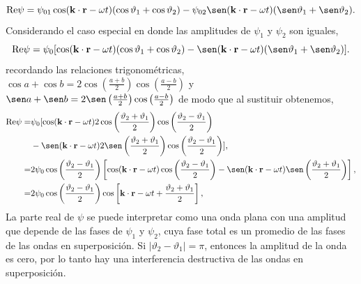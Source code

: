 \documentclass[11pt,fleqn]{book} %
\begin{document}
\begin{example}
\begin{equation*}
\text{Re} \psi=\psi_{01}\cos(\textbf{k}\cdot\textbf{r}-\omega t)(\cos \vartheta_1+\cos \vartheta_2)-\psi_{02}\sen (\textbf{k}\cdot\textbf{r}-\omega t)(\sen \vartheta_1+\sen \vartheta_2).
\end{equation*}
Considerando el caso especial en donde las amplitudes de $\psi_1$ y $\psi_2$ son iguales,
\begin{equation*}
\text{Re} \psi=\psi_{0}[\cos(\textbf{k}\cdot\textbf{r}-\omega t)(\cos \vartheta_1+\cos \vartheta_2)-\sen (\textbf{k}\cdot\textbf{r}-\omega t)(\sen \vartheta_1+\sen \vartheta_2)].
\end{equation*}
recordando las relaciones trigonom\'etricas, $\cos a+ \cos b=2\cos\left( \frac{a+b}{2} \right)\cos\left( \frac{a-b}{2} \right)$ y\\
 $\sen a+ \sen b=2\sen\left( \frac{a+b}{2} \right)\cos\left( \frac{a-b}{2} \right)$  de modo que al sustituir obtenemos,
\begin{equation*}
\begin{split}
\text{Re} \psi=&\psi_{0}[\cos(\textbf{k}\cdot\textbf{r}-\omega t)2\cos\left( \frac{\vartheta_2+\vartheta_1}{2} \right)\cos\left( \frac{\vartheta_2-\vartheta_1}{2} \right)\\
&-\sen (\textbf{k}\cdot\textbf{r}-\omega t)2\sen\left( \frac{\vartheta_2+\vartheta_1}{2} \right)\cos\left( \frac{\vartheta_2-\vartheta_1}{2} \right)],\\
=& 2 \psi_0\cos\left( \frac{\vartheta_2-\vartheta_1}{2} \right) \left[\cos(\textbf{k}\cdot\textbf{r}-\omega t)\cos\left( \frac{\vartheta_2-\vartheta_1}{2} \right)- \sen(\textbf{k}\cdot\textbf{r}-\omega t)\sen\left( \frac{\vartheta_2+\vartheta_1}{2} \right) \right],\\
=& 2 \psi_0\cos\left( \frac{\vartheta_2-\vartheta_1}{2} \right) \cos\left[\textbf{k}\cdot\textbf{r}-\omega t+ \frac{\vartheta_2+\vartheta_1}{2}  \right],
\end{split}
\end{equation*}
La parte real de $\psi$ se puede interpretar como una onda plana con una amplitud que depende de las fases de $\psi_1$ y $\psi_2$, cuya fase total es un promedio de las fases de las ondas en superposici\'on. Si $|\vartheta_2-\vartheta_1|=\pi$, entonces la amplitud de la onda es cero, por lo tanto hay una interferencia destructiva de las ondas en superposici\'on.
\end{example}
\end{document}
